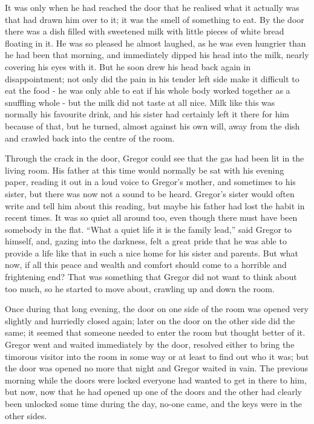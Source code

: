 \documentclass[12pt]{report}
\begin{document}
It was only when he had reached the door that he realised what it
actually was that had drawn him over to it; it was the smell of
something to eat. By the door there was a dish filled with sweetened
milk with little pieces of white bread floating in it. He was so pleased
he almost laughed, as he was even hungrier than he had been that
morning, and immediately dipped his head into the milk, nearly covering
his eyes with it. But he soon drew his head back again in
disappointment; not only did the pain in his tender left side make it
difficult to eat the food - he was only able to eat if his whole body
worked together as a snuffling whole - but the milk did not taste at all
nice. Milk like this was normally his favourite drink, and his sister
had certainly left it there for him because of that, but he turned,
almost against his own will, away from the dish and crawled back into
the centre of the room.

Through the crack in the door, Gregor could see that the gas had been
lit in the living room. His father at this time would normally be sat
with his evening paper, reading it out in a loud voice to Gregor's
mother, and sometimes to his sister, but there was now not a sound to be
heard. Gregor's sister would often write and tell him about this
reading, but maybe his father had lost the habit in recent times. It was
so quiet all around too, even though there must have been somebody in
the flat. ``What a quiet life it is the family lead,'' said Gregor to
himself, and, gazing into the darkness, felt a great pride that he was
able to provide a life like that in such a nice home for his sister and
parents. But what now, if all this peace and wealth and comfort should
come to a horrible and frightening end? That was something that Gregor
did not want to think about too much, so he started to move about,
crawling up and down the room.

Once during that long evening, the door on one side of the room was
opened very slightly and hurriedly closed again; later on the door on
the other side did the same; it seemed that someone needed to enter the
room but thought better of it. Gregor went and waited immediately by the
door, resolved either to bring the timorous visitor into the room in
some way or at least to find out who it was; but the door was opened no
more that night and Gregor waited in vain. The previous morning while
the doors were locked everyone had wanted to get in there to him, but
now, now that he had opened up one of the doors and the other had
clearly been unlocked some time during the day, no-one came, and the
keys were in the other sides.
\end{document}
